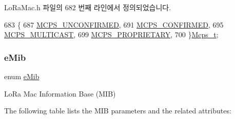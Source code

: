 Lo\+Ra\+Mac.\+h 파일의 682 번째 라인에서 정의되었습니다.


\begin{DoxyCode}
683 \{
687     \mbox{\hyperlink{group___l_o_r_a_m_a_c_gga7b080a046606f23fe030d0aa6d2a0e30a340afc087e96410da04d07fb0470f84a}{MCPS\_UNCONFIRMED}},
691     \mbox{\hyperlink{group___l_o_r_a_m_a_c_gga7b080a046606f23fe030d0aa6d2a0e30a5eb18aef0f2abda0d56add7e868b8546}{MCPS\_CONFIRMED}},
695     \mbox{\hyperlink{group___l_o_r_a_m_a_c_gga7b080a046606f23fe030d0aa6d2a0e30aba17be1162725df5e78e03b3aeff83fa}{MCPS\_MULTICAST}},
699     \mbox{\hyperlink{group___l_o_r_a_m_a_c_gga7b080a046606f23fe030d0aa6d2a0e30a29a54ded2edefe9179a33a14e3ceaca5}{MCPS\_PROPRIETARY}},
700 \}\mbox{\hyperlink{group___l_o_r_a_m_a_c_ga670d0c87a52aeb13391f303a4cf94f00}{Mcps\_t}};
\end{DoxyCode}
\mbox{\label{group___l_o_r_a_m_a_c_ga32ea83d13a3f5bb4b3ec2ace2319ab61}} 
\subsubsection{\texorpdfstring{e\+Mib}{eMib}}
{\footnotesize\ttfamily enum \mbox{\hyperlink{group___l_o_r_a_m_a_c_ga32ea83d13a3f5bb4b3ec2ace2319ab61}{e\+Mib}}}

Lo\+Ra Mac Information Base (M\+IB)

The following table lists the M\+IB parameters and the related attributes\+:


